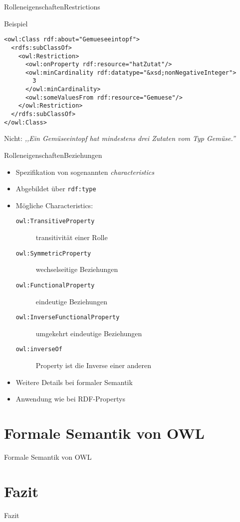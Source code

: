 \documentclass{beamer}
\begin{document}
\begin{frame}[fragile]{Rolleneigenschaften}{Restrictions}
\begin{exampleblock}{Beispiel}
\begin{lstlisting}[lang="xml"]
<owl:Class rdf:about="Gemueseeintopf">
  <rdfs:subClassOf>
    <owl:Restriction>
      <owl:onProperty rdf:resource="hatZutat"/>
      <owl:minCardinality rdf:datatype="&xsd;nonNegativeInteger">
        3
      </owl:minCardinality>
      <owl:someValuesFrom rdf:resource="Gemuese"/>
    </owl:Restriction>
  </rdfs:subClassOf>
</owl:Class>
\end{lstlisting}
\alert{Nicht:} \emph{,,Ein Gemüseeintopf hat mindestens drei
Zutaten vom Typ Gemüse.''}
\end{exampleblock}
\end{frame}


%
\begin{frame}[fragile]{Rolleneigenschaften}{Beziehungen}
\begin{itemize}
\item Spezifikation von sogenannten \emph{characteristics}
\item Abgebildet über \texttt{rdf:type}
\item Mögliche Characteristics:
\begin{description}
\item[\texttt{owl:TransitiveProperty}] transitivität einer Rolle
\item[\texttt{owl:SymmetricProperty}] wechselseitige Beziehungen
\item[\texttt{owl:FunctionalProperty}] eindeutige Beziehungen
\item[\texttt{owl:InverseFunctionalProperty}] umgekehrt eindeutige Beziehungen
\item[\texttt{owl:inverseOf}] Property ist die Inverse einer anderen 


\end{description}
\item Weitere Details bei formaler Semantik
\item Anwendung wie bei RDF-Propertys
\end{itemize}
\end{frame}

\section{Formale Semantik von OWL}

\begin{frame}{Formale Semantik von OWL}
\end{frame}


\section{Fazit}
\begin{frame}{Fazit}
\end{frame}
\end{document}
